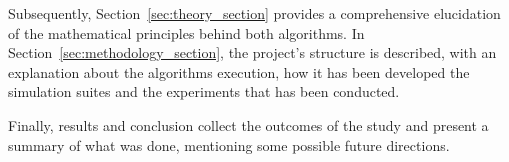 Subsequently, Section~\ref{sec:theory_section} provides a comprehensive elucidation of the mathematical principles behind both algorithms.
In Section~\ref{sec:methodology_section}, the project's structure is described, with an explanation about the algorithms execution, how it has been developed the simulation suites and the experiments that has been conducted.\par

Finally, results and conclusion collect the outcomes of the study and present a summary of what was done, mentioning some possible future directions.





